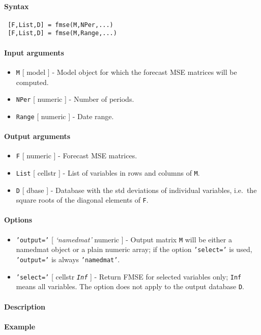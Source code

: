 


	\paragraph{Syntax}
 
 \begin{verbatim}
 [F,List,D] = fmse(M,NPer,...)
 [F,List,D] = fmse(M,Range,...)
 \end{verbatim}
 
 \paragraph{Input arguments}
 
 \begin{itemize}
 \item
   \texttt{M} {[} model {]} - Model object for which the forecast MSE
   matrices will be computed.
 \item
   \texttt{NPer} {[} numeric {]} - Number of periods.
 \item
   \texttt{Range} {[} numeric {]} - Date range.
 \end{itemize}
 
 \paragraph{Output arguments}
 
 \begin{itemize}
 \item
   \texttt{F} {[} numeric {]} - Forecast MSE matrices.
 \item
   \texttt{List} {[} cellstr {]} - List of variables in rows and columns
   of \texttt{M}.
 \item
   \texttt{D} {[} dbase {]} - Database with the std deviations of
   individual variables, i.e.~the square roots of the diagonal elements
   of \texttt{F}.
 \end{itemize}
 
 \paragraph{Options}
 
 \begin{itemize}
 \item
   \texttt{'output='} {[} \emph{`namedmat'} \textbar{} numeric {]} -
   Output matrix \texttt{M} will be either a namedmat object or a plain
   numeric array; if the option \texttt{'select='} is used,
   \texttt{'output='} is always \texttt{'namedmat'}.
 \item
   \texttt{'select='} {[} cellstr \textbar{} \emph{\texttt{Inf}} {]} -
   Return FMSE for selected variables only; \texttt{Inf} means all
   variables. The option does not apply to the output database
   \texttt{D}.
 \end{itemize}
 
 \paragraph{Description}
 
 \paragraph{Example}


